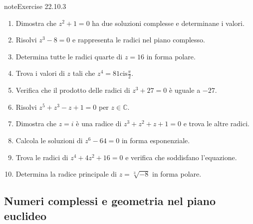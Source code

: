 \documentclass[letterpaper,10pt,italian]{jupyterBook}
\begin{document}
\begin{sphinxadmonition}{note}{Exercise 22.10.3}


\begin{enumerate}
%
\item {} 
\sphinxAtStartPar
Dimostra che \(z^2 + 1 = 0\) ha due soluzioni complesse e determinane i valori.

\item {} 
\sphinxAtStartPar
Risolvi \(z^3 - 8 = 0\) e rappresenta le radici nel piano complesso.

\item {} 
\sphinxAtStartPar
Determina tutte le radici quarte di \(z = 16\) in forma polare.

\item {} 
\sphinxAtStartPar
Trova i valori di \(z\) tali che \(z^4 = 81 \text{cis}\frac{\pi}{2}\).

\item {} 
\sphinxAtStartPar
Verifica che il prodotto delle radici di \(z^3 + 27 = 0\) è uguale a \(-27\).

\item {} 
\sphinxAtStartPar
Risolvi \(z^5 + z^3 - z + 1 = 0\) per \(z \in \mathbb{C}\).

\item {} 
\sphinxAtStartPar
Dimostra che \(z = i\) è una radice di \(z^3 + z^2 + z + 1 = 0\) e trova le altre radici.

\item {} 
\sphinxAtStartPar
Calcola le soluzioni di \(z^6 - 64 = 0\) in forma esponenziale.

\item {} 
\sphinxAtStartPar
Trova le radici di \(z^4 + 4z^2 + 16 = 0\) e verifica che soddisfano l’equazione.

\item {} 
\sphinxAtStartPar
Determina la radice principale di \(z = \sqrt[3]{-8}\) in forma polare.

\end{enumerate}
\end{sphinxadmonition}


\subsection{Numeri complessi e geometria nel piano euclideo}
\label{\detokenize{ch/algebra/complex-algebra-problems:numeri-complessi-e-geometria-nel-piano-euclideo}}\label{\detokenize{ch/algebra/complex-algebra-problems:math-hs-algebra-complex-problems-geometry-2d}} \label{exercise:math-hs:algebra:complex:problems:geometry-2d:ex}
\end{document}

